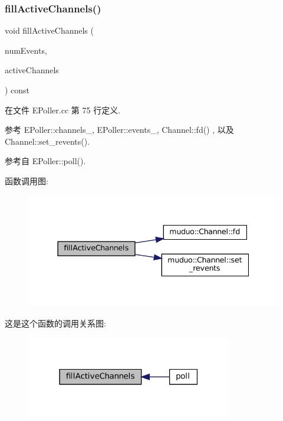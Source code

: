 \subsubsection{\texorpdfstring{fill\+Active\+Channels()}{fillActiveChannels()}}
{\footnotesize\ttfamily void fill\+Active\+Channels (\begin{DoxyParamCaption}\item[{int}]{num\+Events,  }\item[{\hyperlink{classmuduo_1_1EPoller_a0b74248ffee6df294563618187b52404}{Channel\+List} $\ast$}]{active\+Channels }\end{DoxyParamCaption}) const\hspace{0.3cm}{\ttfamily [private]}}



在文件 E\+Poller.\+cc 第 75 行定义.



参考 E\+Poller\+::channels\+\_\+, E\+Poller\+::events\+\_\+, Channel\+::fd() , 以及 Channel\+::set\+\_\+revents().



参考自 E\+Poller\+::poll().

函数调用图\+:
\nopagebreak
\begin{figure}[H]
\begin{center}
\leavevmode
\includegraphics[width=337pt]{classmuduo_1_1EPoller_a93b3d6d6cac94e92c2ddfd91e9b18cc0_cgraph}
\end{center}
\end{figure}
这是这个函数的调用关系图\+:
\nopagebreak
\begin{figure}[H]
\begin{center}
\leavevmode
\includegraphics[width=255pt]{classmuduo_1_1EPoller_a93b3d6d6cac94e92c2ddfd91e9b18cc0_icgraph}
\end{center}
\end{figure}
\mbox{\label{classmuduo_1_1EPoller_a0165aabf2721e39f87ad67b05ece9267}} 
